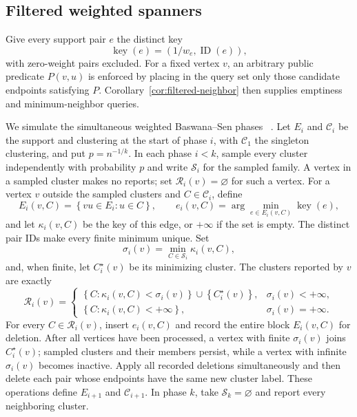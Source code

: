 \documentclass[11pt]{article}
\theoremstyle{definition}
\newcommand{\set}[1]{\left\{#1\right\}}
\begin{document}
\subsection{Filtered weighted spanners}

Give every support pair $e$ the distinct key
\[
        \operatorname{key}(e)=(1/w_e,\operatorname{ID}(e)),
\]
with zero-weight pairs excluded.  For a fixed vertex $v$, an arbitrary
public predicate $P(v,u)$ is enforced by placing in the query set only those
candidate endpoints satisfying $P$.  Corollary~\ref{cor:filtered-neighbor}
then supplies emptiness and minimum-neighbor queries.

We simulate the simultaneous weighted Baswana--Sen phases
~\cite{BaswanaSen2007}.  Let $E_i$ and $\mathcal C_i$ be the support and
clustering at the start of phase $i$, with $\mathcal C_1$ the singleton
clustering, and put $p=n^{-1/k}$.  In each phase $i<k$, sample every cluster
independently with probability $p$ and write $\mathcal S_i$ for the sampled
family.  A vertex in a sampled cluster makes no reports; set
$\mathcal R_i(v)=\varnothing$ for such a vertex.  For a vertex $v$ outside
the sampled clusters and
$C\in\mathcal C_i$, define
\[
 E_i(v,C)=\set{vu\in E_i:u\in C},\qquad
 e_i(v,C)=\arg\min_{e\in E_i(v,C)}\operatorname{key}(e),
\]
and let $\kappa_i(v,C)$ be the key of this edge, or $+\infty$ if the set is
empty.  The distinct pair IDs make every finite minimum unique.  Set
\[
 \sigma_i(v)=\min_{C\in\mathcal S_i}\kappa_i(v,C),
\]
and, when finite, let $C_i^\star(v)$ be its minimizing cluster.  The clusters
reported by $v$ are exactly
\[
 \mathcal R_i(v)=
 \begin{cases}
  \set{C:\kappa_i(v,C)<\sigma_i(v)}\cup\set{C_i^\star(v)},
       &\sigma_i(v)<+\infty,\\
  \set{C:\kappa_i(v,C)<+\infty},&\sigma_i(v)=+\infty.
 \end{cases}
\]
For every $C\in\mathcal R_i(v)$, insert $e_i(v,C)$ and record the entire
block $E_i(v,C)$ for deletion.  After all vertices have been processed, a
vertex with finite $\sigma_i(v)$ joins $C_i^\star(v)$; sampled clusters and
their members persist, while a vertex with infinite $\sigma_i(v)$ becomes
inactive.  Apply all recorded deletions simultaneously and then delete each
pair whose endpoints have the same new cluster label.  These operations
define $E_{i+1}$ and $\mathcal C_{i+1}$.  In phase $k$, take
$\mathcal S_k=\varnothing$ and report every neighboring cluster.
\end{document}
